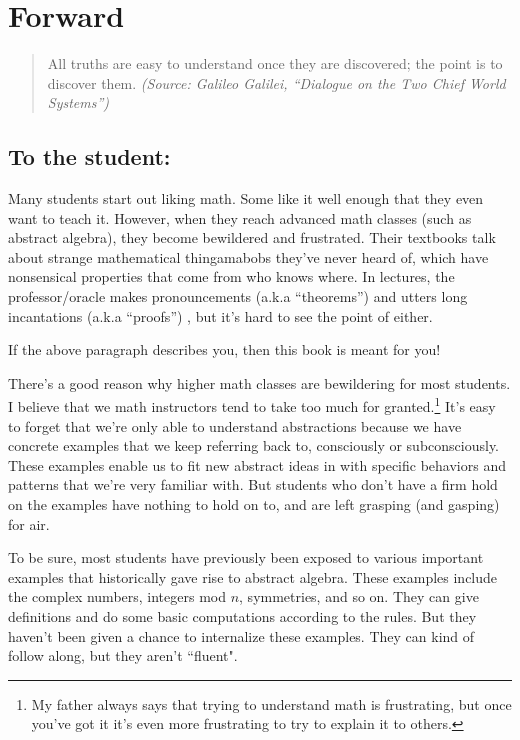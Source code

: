 \chapter*{Forward}\label{chap:forward}


\begin{quote}
All truths are easy to understand once they are discovered; the point is to discover them.
\emph{(Source:  Galileo Galilei, ``Dialogue on the Two Chief World Systems'')}
\end{quote}

\section*{To the student:}\label{sec:toStudent}

\medskip

Many students start out liking math. Some like it well enough that they even want to teach it. However, when they reach advanced math classes (such as abstract algebra), they become bewildered and frustrated. Their textbooks talk about strange mathematical thingamabobs they've never heard of, which have nonsensical properties that come from who knows where. In lectures, the professor/oracle  makes pronouncements (a.k.a ``theorems'') and utters long incantations (a.k.a ``proofs'') , but it's hard to see the point of either. 
\medskip

If the above paragraph describes you, then this book is meant for you!
\medskip

There's a good reason why higher math classes are bewildering for most students. I believe that we math instructors tend to take too much for granted.\footnote{My father always says that trying to understand math is frustrating, but once you've got it it's even more frustrating to try to explain it to others.} It's easy to forget that we're only able to understand abstractions because we have concrete examples that we keep referring back to, consciously or subconsciously. These examples enable us to fit new abstract ideas in with specific behaviors and patterns that we're very familiar with. But students who don't have a firm hold on the examples have nothing to hold on to, and are left grasping (and gasping) for air. 

To be sure, most students have previously been exposed to various important examples that historically gave rise to abstract algebra. These examples include the complex numbers, integers mod $n$, symmetries, and so on. They can give definitions and do some basic computations according to the rules. But they haven't been given a chance to internalize these examples.  They can kind of follow along, but they aren't ``fluent".

